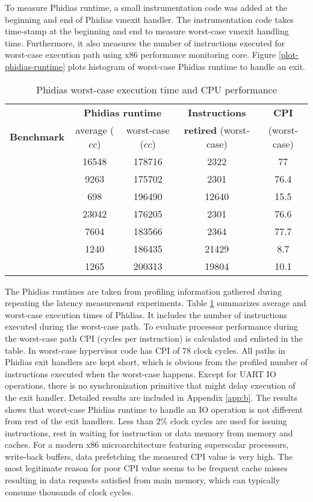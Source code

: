 To measure Phidias runtime, a small instrumentation code was added at the beginning and end of Phidias vmexit handler.
The instrumentation code takes time-stamp at the beginning and end to measure worst-case vmexit handling time.
Furthermore, it also measures the number of instructions executed for worst-case execution path using x86 performance monitoring core.
Figure \ref{plot-phidias-runtime} plots histogram of worst-case Phidias runtime to handle an exit. 



\begin{table}[!h]
\centering
\begin{tabular}{|c|c|c|c|c|}  
\hline
						& \multicolumn{2}{|c|}{\textbf{Phidias runtime}} & \textbf{Instructions}	& \textbf{CPI}\\
\textbf{Benchmark}		& average ($cc$)	&	worst-case ($cc$)	&	\textbf{retired}  (worst-case) &	(worst-case) \\ \hline 
\mcachepressure{}	& 16548	& 178716 & 2322 & 77\\ \hline
\mforkops{}		& 9263 & 175702 & 2301 & 76.4\\ \hline
\mfileops{}		& 698 & 196490 & 12640 & 15.5\\ \hline
\mhackbench{} 		& 23042 & 176205 & 2301 & 76.6\\ \hline
\mmmapops{} 		& 7604 & 183566 & 2364 & 77.7\\ \hline
\mstdout{} 			& 1240 & 186435 & 21429 & 8.7\\ \hline
\mthreadops{} 		& 1265 & 200313 & 19804 & 10.1\\ \hline
\end{tabular}
\caption{Phidias worst-case execution time and CPU performance} 
\label{phidias-runtime}
\end{table}

The Phidias runtimes are taken from profiling information gathered during repeating the latency measurement experiments.
Table \ref{phidias-runtime} summarizes average and worst-case execution times of Phidias. It includes the number of
instructions executed during the worst-case path. To evaluate processor performance during the worst-case path CPI (cycles per instruction)
is calculated and enlisted in the table. 
In worst-case hypervisor code has CPI of $78$ clock cycles.
All paths in Phidias exit handlers are kept short, which is obvious from the profiled number of instructions executed when the worst-case happens.
Except for UART IO operations, there is no synchronization primitive that might delay execution of the exit handler.
Detailed results are included in Appendix \ref{app:b}.
The results shows that worst-case Phidias runtime to handle an IO operation is not different from rest of the exit handlers. 
Less than $2\%$ clock cycles are used for issuing instructions, rest in waiting for instruction or data memory from memory and caches.
For a modern x86 microarchitecture featuring superscalar processors, write-back buffers, data prefetching the measured CPI value is very high.
The most legitimate reason for poor CPI value seems to be frequent cache misses resulting in data requests satisfied from main memory, which 
can typically consume thousands of clock cycles.

